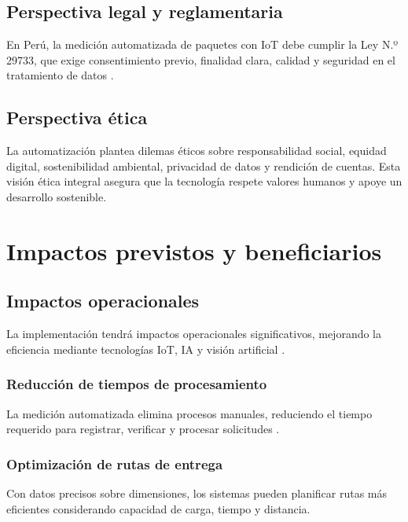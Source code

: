 \subsection{Perspectiva legal y reglamentaria}

En Perú, la medición automatizada de paquetes con IoT debe cumplir la Ley N.º 29733, que exige consentimiento previo, finalidad clara, calidad y seguridad en el tratamiento de datos \cite{EditoraPer2973}.

\subsection{Perspectiva ética}

La automatización plantea dilemas éticos sobre responsabilidad social, equidad digital, sostenibilidad ambiental, privacidad de datos y rendición de cuentas. Esta visión ética integral asegura que la tecnología respete valores humanos y apoye un desarrollo sostenible.

\section{Impactos previstos y beneficiarios}

\subsection{Impactos operacionales}

La implementación tendrá impactos operacionales significativos, mejorando la eficiencia mediante tecnologías IoT, IA y visión artificial \cite{RedaccinTLW2024,Alharbi2023}.

\subsubsection{Reducción de tiempos de procesamiento}

La medición automatizada elimina procesos manuales, reduciendo el tiempo requerido para registrar, verificar y procesar solicitudes \cite{Xu2012}.

\subsubsection{Optimización de rutas de entrega}

Con datos precisos sobre dimensiones, los sistemas pueden planificar rutas más eficientes considerando capacidad de carga, tiempo y distancia.

